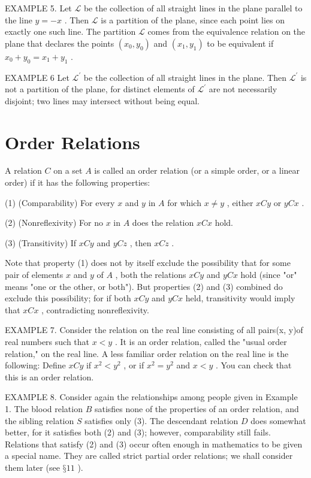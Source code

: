 EXAMPLE 5. Let \(\mathcal{L}\) be the collection of all straight lines in the plane parallel to the line \(y =  - x\) . Then \(\mathcal{L}\) is a partition of the plane, since each point lies on exactly one such line. The partition \(\mathcal{L}\) comes from the equivalence relation on the plane that declares the points \(\left( {{x}_{0},{y}_{0}}\right)\) and \(\left( {{x}_{1},{y}_{1}}\right)\) to be equivalent if \({x}_{0} + {y}_{0} = {x}_{1} + {y}_{1}\) .

EXAMPLE 6 Let \({\mathcal{L}}^{\prime }\) be the collection of all straight lines in the plane. Then \({\mathcal{L}}^{\prime }\) is not a partition of the plane, for distinct elements of \({\mathcal{L}}^{\prime }\) are not necessarily disjoint; two lines may intersect without being equal.

\section*{Order Relations}

A relation \(C\) on a set \(A\) is called an order relation (or a simple order, or a linear order) if it has the following properties:

(1) (Comparability) For every \(x\) and \(y\) in \(A\) for which \(x \neq  y\) , either \({xCy}\) or \({yCx}\) .

(2) (Nonreflexivity) For no \(x\) in \(A\) does the relation \({xCx}\) hold.

(3) (Transitivity) If \({xCy}\) and \({yCz}\) , then \({xCz}\) .

Note that property (1) does not by itself exclude the possibility that for some pair of elements \(x\) and \(y\) of \(A\) , both the relations \({xCy}\) and \({yCx}\) hold (since "or" means "one or the other, or both"). But properties (2) and (3) combined do exclude this possibility; for if both \({xCy}\) and \({yCx}\) held, transitivity would imply that \({xCx}\) , contradicting nonreflexivity.

EXAMPLE 7. Consider the relation on the real line consisting of all pairs(x, y)of real numbers such that \(x < y\) . It is an order relation, called the "usual order relation," on the real line. A less familiar order relation on the real line is the following: Define \({xCy}\) if \({x}^{2} < {y}^{2}\) , or if \({x}^{2} = {y}^{2}\) and \(x < y\) . You can check that this is an order relation.

EXAMPLE 8. Consider again the relationships among people given in Example 1. The blood relation \(B\) satisfies none of the properties of an order relation, and the sibling relation \(S\) satisfies only (3). The descendant relation \(D\) does somewhat better, for it satisfies both (2) and (3); however, comparability still fails. Relations that satisfy (2) and (3) occur often enough in mathematics to be given a special name. They are called strict partial order relations; we shall consider them later (see \(§{11}\) ).

